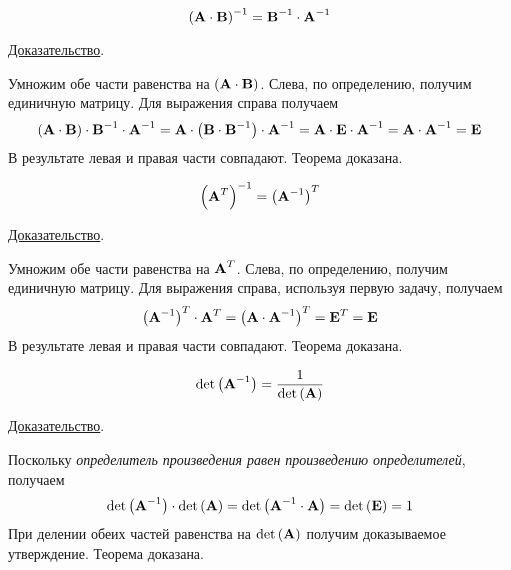 \begin{theorem}
    \begin{equation*}
        \left( \bf{A} \cdot \bf{B} \right)^{-1} = \bf{B}^{-1} \cdot \bf{A}^{-1}
    \end{equation*}

    \underline{Доказательство}.
    \vspace{5pt}

    Умножим обе части равенства на $\left( \bf{A} \cdot \bf{B} \right)$. Слева, по определению, получим единичную матрицу.
    Для выражения справа получаем
    \begin{equation*}
        \left( \bf{A} \cdot \bf{B} \right) \cdot \bf{B}^{-1} \cdot \bf{A}^{-1} = \bf{A} \cdot \left( \bf{B} \cdot \bf{B}^{-1} \right) \cdot \bf{A}^{-1} =
        \bf{A} \cdot \bf{E} \cdot \bf{A}^{-1} = \bf{A} \cdot \bf{A}^{-1} = \bf{E}
    \end{equation*}
    В результате левая и правая части совпадают. Теорема доказана.
\end{theorem}
\pagebreak
\begin{theorem}
    \begin{equation*}
        \left( \bf{A}^T \right)^{-1} = \left( \bf{A}^{-1} \right)^T
    \end{equation*}

    \underline{Доказательство}.
    \vspace{5pt}

    Умножим обе части равенства на $\displaystyle \bf{A}^T$. Слева, по определению, получим единичную матрицу. Для
    выражения справа, используя первую задачу, получаем
    \begin{equation*}
        \left( \bf{A}^{-1} \right)^T \cdot \bf{A}^T = \left( \bf{A} \cdot \bf{A}^{-1} \right)^T = \bf{E}^T = \bf{E}
    \end{equation*}
    В результате левая и правая части совпадают. Теорема доказана.
\end{theorem}

\begin{theorem}
    \begin{equation*}
        \det \left( \bf{A}^{-1} \right) = \frac{1}{\det\left( \bf{A} \right)}
    \end{equation*}

    \underline{Доказательство}.
    \vspace{5pt}

    Поскольку \emph{определитель произведения равен произведению определителей}, получаем
    \begin{equation*}
        \det \left( \bf{A}^{-1} \right) \cdot \det \left( \bf{A} \right) =
        \det \left( \bf{A}^{-1} \cdot \bf{A} \right) = \det \left( \bf{E} \right) = 1
    \end{equation*}
    При делении обеих частей равенства на $\det \left( \bf{A} \right)$ получим доказываемое утверждение. Теорема доказана.
\end{theorem}

